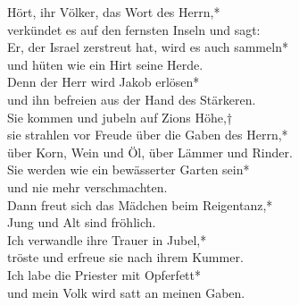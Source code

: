 Hört, ihr Völker, das Wort des Herrn,*\\
verkündet es auf den fernsten Inseln und sagt:\\ 
\vin Er, der Israel zerstreut hat, wird es auch sammeln*\\
\vin und hüten wie ein Hirt seine Herde.\\
Denn der Herr wird Jakob erlösen*\\
und ihn befreien aus der Hand des Stärkeren.\\
\vin Sie kommen und jubeln auf Zions Höhe,†\\
\vin sie strahlen vor Freude über die Gaben des Herrn,*\\ 
\vin über Korn, Wein und Öl, über Lämmer und Rinder.\\ 
Sie werden wie ein bewässerter Garten sein*\\ 
und nie mehr verschmachten.\\
\vin Dann freut sich das Mädchen beim Reigentanz,*\\
\vin Jung und Alt sind fröhlich.\\ 
Ich verwandle ihre Trauer in Jubel,*\\
tröste und erfreue sie nach ihrem Kummer.\\
\vin Ich labe die Priester mit Opferfett*\\
\vin und mein Volk wird satt an meinen Gaben.\\







